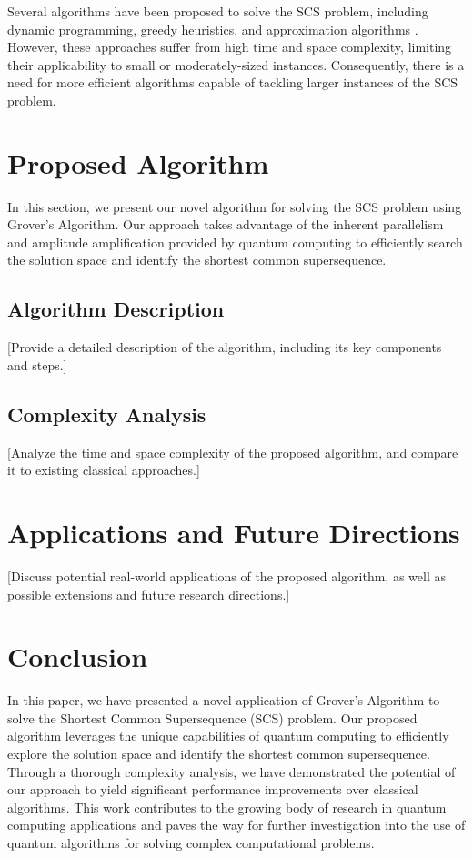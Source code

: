 Several algorithms have been proposed to solve the SCS problem, including dynamic programming, greedy heuristics, and approximation algorithms \cite{gusfield1997algorithms}. However, these approaches suffer from high time and space complexity, limiting their applicability to small or moderately-sized instances. Consequently, there is a need for more efficient algorithms capable of tackling larger instances of the SCS problem.

\section{Proposed Algorithm}

In this section, we present our novel algorithm for solving the SCS problem using Grover's Algorithm. Our approach takes advantage of the inherent parallelism and amplitude amplification provided by quantum computing to efficiently search the solution space and identify the shortest common supersequence.

\subsection{Algorithm Description}

[Provide a detailed description of the algorithm, including its key components and steps.]

\subsection{Complexity Analysis}

[Analyze the time and space complexity of the proposed algorithm, and compare it to existing classical approaches.]

\section{Applications and Future Directions}

[Discuss potential real-world applications of the proposed algorithm, as well as possible extensions and future research directions.]

\section{Conclusion}

In this paper, we have presented a novel application of Grover's Algorithm to solve the Shortest Common Supersequence (SCS) problem. Our proposed algorithm leverages the unique capabilities of quantum computing to efficiently explore the solution space and identify the shortest common supersequence. Through a thorough complexity analysis, we have demonstrated the potential of our approach to yield significant performance improvements over classical algorithms. This work contributes to the growing body of research in quantum computing applications and paves the way for further investigation into the use of quantum algorithms for solving complex computational problems.

